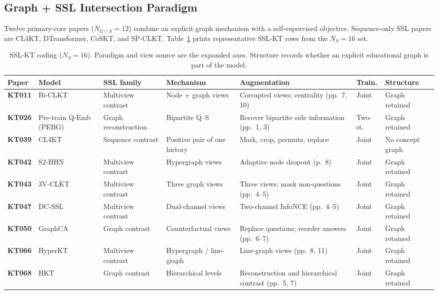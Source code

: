 \documentclass[lettersize,journal]{IEEEtran}
\begin{document}
\subsection{Graph + SSL Intersection Paradigm}
Twelve primary-core papers ($N_{G \cap S} = 12$) combine an explicit graph mechanism with a self-supervised objective. Sequence-only SSL papers are CL4KT, DTransformer, CoSKT, and SP-CLKT. Table~\ref{tab:ssl_taxonomy} prints representative SSL-KT rows from the $N_S=16$ set.
\begin{table}[t]
\caption{SSL-KT coding ($N_S=16$). Paradigm and view source are the expanded axes. Structure records whether an explicit educational graph is part of the model.}
\label{tab:ssl_taxonomy}
\centering
\footnotesize
\setlength{\tabcolsep}{3.0pt}
\begin{tabular}{@{}l>{\raggedright\arraybackslash}p{2.15cm}>{\raggedright\arraybackslash}p{1.85cm}>{\raggedright\arraybackslash}p{1.85cm}>{\raggedright\arraybackslash}p{2.05cm}l>{\raggedright\arraybackslash}p{1.45cm}@{}}
\toprule
\textbf{Paper} & \textbf{Model} & \textbf{SSL family} & \textbf{Mechanism} & \textbf{Augmentation} & \textbf{Train.} & \textbf{Structure} \\
\midrule
\textbf{KT011} & Bi-CLKT \cite{KT011_BiCLKT_2022} & Multiview contrast & Node + graph views & Corrupted views; centrality (pp.~7, 10) & Joint & Graph retained \\
\textbf{KT026} & Pre-train Q-Emb (PEBG) \cite{KT026_PretrainQ_2020} & Graph reconstruction & Bipartite Q--S & Recover bipartite side information (pp.~1, 3) & Two-st. & Graph retained \\
\textbf{KT039} & CL4KT \cite{KT039_CL4KT_2022} & Sequence contrast & Positive pair of one history & Mask, crop, permute, replace & Joint & No concept graph \\
\textbf{KT042} & S2-HHN \cite{KT042_S2HHN_2023} & Multiview contrast & Hypergraph views & Adaptive node dropout (p.~8) & Joint & Graph retained \\
\textbf{KT043} & 3V-CLKT \cite{KT043_3VCLKT_2024} & Multiview contrast & Three graph views & Three views; mask non-questions (pp.~4--5) & Joint & Graph retained \\
\textbf{KT047} & DC-SSL \cite{KT047_DCSSL_2023} & Multiview contrast & Dual-channel views & Two-channel InfoNCE (pp.~4--5) & Joint & Graph retained \\
\textbf{KT050} & GraphCA \cite{KT050_GraphCA_2023} & Graph contrast & Counterfactual views & Replace questions; reorder answers (pp.~6--7) & Joint & Graph retained \\
\textbf{KT066} & HyperKT \cite{KT066_HyperKT_2025} & Multiview contrast & Hypergraph / line-graph & Line-graph views (pp.~8, 11) & Joint & Graph retained \\
\textbf{KT068} & HKT \cite{KT068_HKT_2025} & Graph contrast & Hierarchical levels & Reconstruction and hierarchical contrast (pp.~5, 7) & Joint & Graph retained \\
\bottomrule
\end{tabular}
\end{table}
\end{document}
